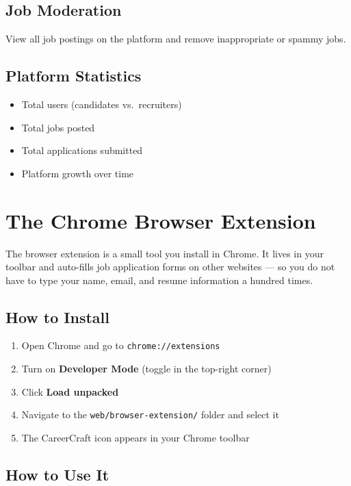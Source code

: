 \documentclass[12pt, a4paper]{report}
\newcommand{\code}[1]{\texttt{\small #1}}
\newcommand{\filepath}[1]{\texttt{\small\color{ccpurpledk}#1}}
\begin{document}
\section{Job Moderation}

View all job postings on the platform and remove inappropriate or spammy jobs.

\section{Platform Statistics}

\begin{itemize}
  \item Total users (candidates vs.\ recruiters)
  \item Total jobs posted
  \item Total applications submitted
  \item Platform growth over time
\end{itemize}

\chapter{The Chrome Browser Extension}

The browser extension is a small tool you install in Chrome.  It lives in your
toolbar and auto-fills job application forms on other websites --- so you do not
have to type your name, email, and resume information a hundred times.

\section{How to Install}

\begin{enumerate}
  \item Open Chrome and go to \code{chrome://extensions}
  \item Turn on \textbf{Developer Mode} (toggle in the top-right corner)
  \item Click \textbf{Load unpacked}
  \item Navigate to the \filepath{web/browser-extension/} folder and select it
  \item The CareerCraft icon appears in your Chrome toolbar
\end{enumerate}

\section{How to Use It}
\end{document}

